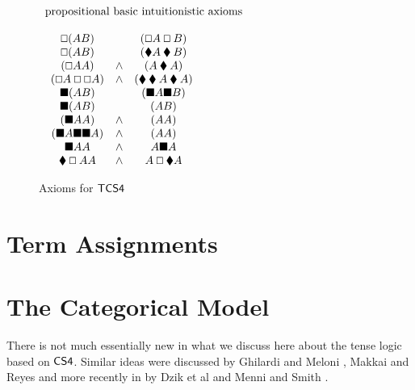 \documentclass{article}
\let\Diamond\relax
\newcommand{\bLozenge}{\mathbin{\blacklozenge}}
\let\to\relax
\newcommand{\to}{\rightarrow}
\renewcommand{\Box}{\oblong}
\begin{document}
\begin{figure}
  \begin{mdframed}
  \begin{center}
    \begin{math}
      \begin{array}{lll}
        \mbox{propositional basic intuitionistic  axioms}\\\\
        \begin{array}{ccc}          
          \Box (A \to B) &\to &(\Box A \to \Box B)\\
          \Box (A \to B) &\to &(\bLozenge A\to \bLozenge B)\\
          (\Box A\to A) &\land &(A\to \bLozenge A)\\
          (\Box A\to \Box\Box A) &\land &(\bLozenge \bLozenge A \to \bLozenge A)\\
          \blacksquare (A \to B) &\to &(\blacksquare A \to \blacksquare B)\\
          \blacksquare (A \to B) &\to &(\Diamond A\to \Diamond B)\\
          (\blacksquare A\to A) &\land &(A\to \Diamond A)\\
          (\blacksquare A\to \blacksquare\blacksquare A) &\land &(\Diamond \Diamond A \to \Diamond A)\\
          \Diamond \blacksquare A\to A &\land &A\to \blacksquare\Diamond A\\
          \bLozenge\Box A\to A &\land &A\to \Box \bLozenge A\\
        \end{array}
      \end{array}
      \end{math}
  \end{center}
 \end{mdframed}
  \caption{Axioms for $\sf{TCS4}$}
  \label{axiomCS4}
\end{figure}

\section{Term Assignments}
\label{sec:term_assignments}





\section{The Categorical Model}
There is not much essentially new in what we discuss here about the tense logic based on $\sf{CS4}$. Similar ideas were discussed by  Ghilardi and Meloni \cite{ghilardi1988}, Makkai and Reyes \cite{makkai1995} and more recently in by Dzik et al \cite{dziketal2012} and Menni and Smith \cite{Menni:2014}.
\end{document}
